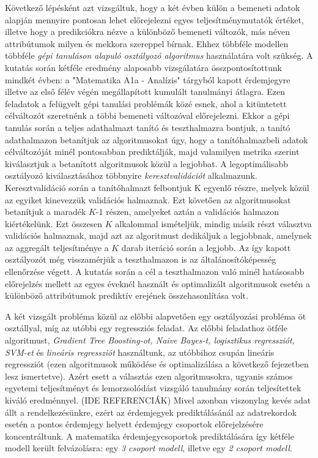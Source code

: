 \documentclass[12pt]{article}
\begin{document}
Következő lépésként azt vizsgáltuk, hogy a két évben külön a bemeneti adatok alapján mennyire pontosan lehet előrejelezni egyes teljesítménymutatók értéket, illetve hogy a predikciókra nézve a különböző bemeneti változók, más néven attribútumok milyen és mekkora szereppel bírnak. Ehhez többféle modellen többféle \textit{gépi tanuláson alapuló osztályozó algoritmus} használatára volt szükség. A kutatás során kétféle eredmény alaposabb vizsgálatára összpontosítottunk mindkét évben: a "Matematika A1a - Analízis" tárgyból kapott érdemjegyre illetve az első félév végén megállapított kumulált tanulmányi átlagra. Ezen feladatok a felügyelt gépi tanulási problémák közé esnek, ahol a kitüntetett célváltozót szeretnénk a többi bemeneti változóval előrejelezni. Ekkor a gépi tanulás során a teljes adathalmazt tanító és teszthalmazra bontjuk, a tanító adathalmazon betanítjuk az algoritmusokat úgy, hogy a tanítóhalmazbeli adatok célváltozóját minél pontosabban prediktálják, majd valamilyen metrika szerint kiválasztjuk a betanított algoritmusok közül a legjobbat. A legoptimálisabb osztályozó kiválasztásához többnyire \textit{keresztvalidációt} alkalmazunk. Keresztvalidáció során a tanítóhalmazt felbontjuk K egyenlő részre, melyek közül az egyiket kinevezzük validációs halmaznak. Ezt követően az algoritmusokat betanítjuk a maradék $K$-$1$ részen, amelyeket aztán a validációs halmazon kiértékelünk. Ezt összesen $K$ alkalommal ismételjük, mindig másik részt választva validációs halmaznak, majd azt az algoritmust dedikáljuk a legjobbnak, amelynek az aggregált teljesítménye a $K$ darab iteráció során a legjobb. Az így kapott osztályozót még visszamérjük a teszthalmazon is az általánosítóképesség ellenőrzése végett. A kutatás során a cél a teszthalmazon való minél hatásosabb előrejelzés mellett az egyes éveknél használt és optimalizált algoritmusok esetén a különböző attribútumok prediktív erejének összehasonlítása volt.

A két vizsgált probléma közül az előbbi alapvetően egy osztályozási probléma öt osztállyal, míg az utóbbi egy regressziós feladat. Az előbbi feladathoz ötféle algoritmust, \textit{Gradient Tree Boosting-ot, Naive Bayes-t, logisztikus regressziót, SVM-et} és \textit{lineáris regressziót} használtunk, az utóbbihoz csupán lineáris regressziót (ezen algoritmusok működése és optimalizálása a következő fejezetben lesz ismertetve). Azért esett a választás ezen algoritmusokra, ugyanis számos egyetemi teljesítményt és lemorzsolódást vizsgáló tanulmány során teljesítettek kiváló eredménnyel. (IDE REFERENCIÁK) Mivel azonban viszonylag kevés adat állt a rendelkezésünkre, ezért az érdemjegyek prediktálásánál az adatrekordok esetén a pontos érdemjegy helyett érdemjegy csoportok előrejelzésére koncentráltunk. A matematika érdemjegycsoportok prediktálására így kétféle modell került felvázolásra: egy \textit{3 csoport modell}, illetve egy \textit{2 csoport modell}.
\end{document}
